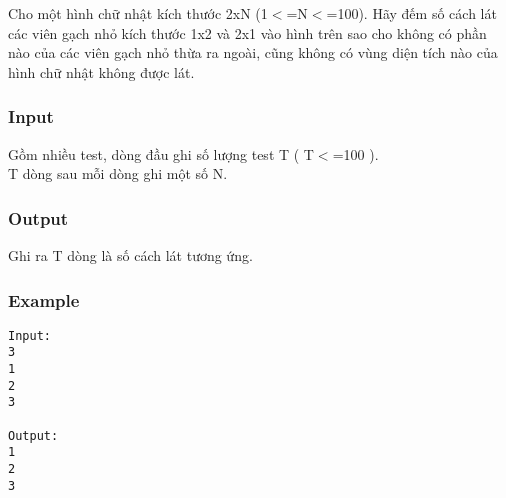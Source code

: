



   Cho một hình chữ nhật kích thước 2xN (1$<$=N$<$=100). Hãy đếm số cách lát các viên gạch nhỏ kích thước 1x2 và 2x1 vào hình trên sao cho không có phần nào của các viên gạch nhỏ thừa ra ngoài, cũng không có vùng diện tích nào của hình chữ nhật không được lát.  

\subsubsection{   Input  }

   Gồm nhiều test, dòng đầu ghi số lượng test T ( T$<$=100 ).   
\\   T dòng sau mỗi dòng ghi một số N.  

\subsubsection{   Output  }

   Ghi ra T dòng là số cách lát tương ứng.  

\subsubsection{   Example  }
\begin{verbatim}
Input:
3
1
2
3

Output:
1
2
3
\end{verbatim}